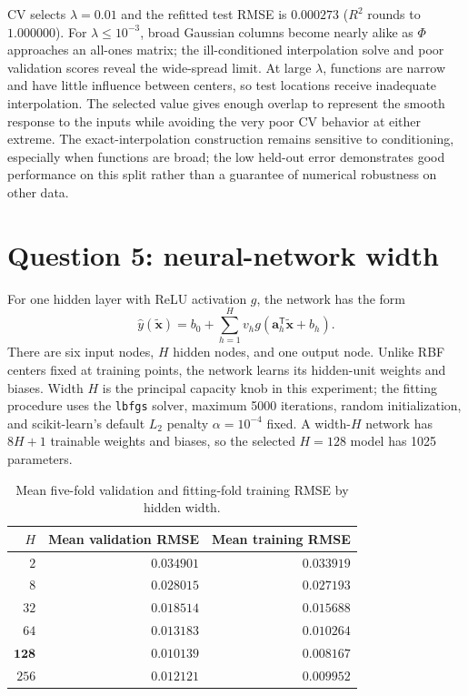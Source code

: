 \documentclass[11pt]{article}
\newcommand{\toprule}{\hline}
\newcommand{\midrule}{\hline}
\newcommand{\bottomrule}{\hline}
\begin{document}
CV selects $\lambda=0.01$ and the refitted test RMSE is $0.000273$ ($R^2$ rounds to $1.000000$). For $\lambda\leq10^{-3}$, broad Gaussian columns become nearly alike as $\Phi$ approaches an all-ones matrix; the ill-conditioned interpolation solve and poor validation scores reveal the wide-spread limit. At large $\lambda$, functions are narrow and have little influence between centers, so test locations receive inadequate interpolation. The selected value gives enough overlap to represent the smooth response to the inputs while avoiding the very poor CV behavior at either extreme. The exact-interpolation construction remains sensitive to conditioning, especially when functions are broad; the low held-out error demonstrates good performance on this split rather than a guarantee of numerical robustness on other data.

\section{Question 5: neural-network width}
For one hidden layer with ReLU activation $g$, the network has the form
\begin{equation}
\hat y(\tilde{\mathbf{x}})=b_0+\sum_{h=1}^{H}v_hg(\mathbf a_h^{\mathsf T}\tilde{\mathbf{x}}+b_h).
\end{equation}
There are six input nodes, $H$ hidden nodes, and one output node. Unlike RBF centers fixed at training points, the network learns its hidden-unit weights and biases. Width $H$ is the principal capacity knob in this experiment; the fitting procedure uses the \texttt{lbfgs} solver, maximum 5000 iterations, random initialization, and scikit-learn's default $L_2$ penalty $\alpha=10^{-4}$ fixed. A width-$H$ network has $8H+1$ trainable weights and biases, so the selected $H=128$ model has 1025 parameters.

\begin{table}[h]
\centering
\caption{Mean five-fold validation and fitting-fold training RMSE by hidden width.}
\label{tab:ann}
\begin{tabular}{rrr}
\toprule
$H$ & Mean validation RMSE & Mean training RMSE \\
\midrule
$2$ & $0.034901$ & $0.033919$ \\
$8$ & $0.028015$ & $0.027193$ \\
$32$ & $0.018514$ & $0.015688$ \\
$64$ & $0.013183$ & $0.010264$ \\
$\mathbf{128}$ & $\mathbf{0.010139}$ & $0.008167$ \\
$256$ & $0.012121$ & $0.009952$ \\
\bottomrule
\end{tabular}
\end{table}
\end{document}
